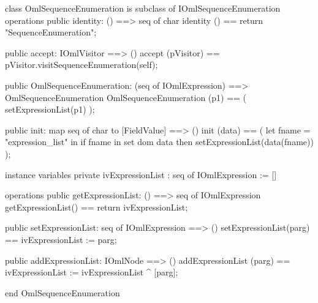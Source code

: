 \begin{vdm_al}
class OmlSequenceEnumeration is subclass of IOmlSequenceEnumeration
operations
  public identity: () ==> seq of char
  identity () == return "SequenceEnumeration";

  public accept: IOmlVisitor ==> ()
  accept (pVisitor) == pVisitor.visitSequenceEnumeration(self);

  public OmlSequenceEnumeration:
      (seq of IOmlExpression) ==> OmlSequenceEnumeration
  OmlSequenceEnumeration (p1) == 
   ( setExpressionList(p1) );

  public init: map seq of char to [FieldValue] ==> ()
  init (data) ==
    ( let fname = "expression_list" in
        if fname in set dom data
        then setExpressionList(data(fname)) );

instance variables
  private ivExpressionList : seq of IOmlExpression := []

operations
  public getExpressionList: () ==> seq of IOmlExpression
  getExpressionList() == return ivExpressionList;

  public setExpressionList: seq of IOmlExpression ==> ()
  setExpressionList(parg) == ivExpressionList := parg;

  public addExpressionList: IOmlNode ==> ()
  addExpressionList (parg) == ivExpressionList := ivExpressionList ^ [parg];

end OmlSequenceEnumeration
\end{vdm_al}

